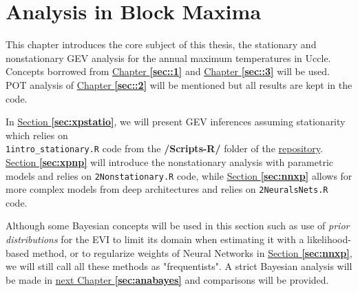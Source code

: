 \documentclass[11pt,a4paper,openany, twosided]{book}
\begin{document}
\newpage




\chapter{Analysis in Block Maxima}\label{sec:anagev}
\minitoc \thispagestyle{empty}
 \vspace{1cm}
 
 This chapter introduces the core subject of this thesis, the stationary and nonstationary GEV analysis for the annual maximum temperatures in Uccle. Concepts borrowed from \hyperref[sec::1]{Chapter \textbf{\ref{sec::1}}} and \hyperref[sec::3]{Chapter \textbf{\ref{sec::3}}} will be used. POT analysis of \hyperref[sec::2]{Chapter \textbf{\ref{sec::2}}} will be mentioned but all results are kept in the code. 

In \hyperref[sec:xpstatio]{Section \textbf{\ref{sec:xpstatio}}}, we will present GEV inferences assuming stationarity which relies on \\ \texttt{1intro\_stationary.R} code from the \textbf{/Scripts-R/} folder of the \href{https://github.com/proto4426/PissoortThesis/}{repository}.
\hyperref[sec:xpnp]{Section \textbf{\ref{sec:xpnp}}} will introduce the nonstationary analysis with parametric models and relies on \texttt{2Nonstationary.R} code, while \hyperref[sec:nnxp]{Section \textbf{\ref{sec:nnxp}}} allows for more complex models from deep architectures and relies on \texttt{2NeuralsNets.R} code. 

Although some Bayesian concepts will be used in this section such as use of \emph{prior distributions} for the EVI to limit its domain when estimating it with a likelihood-based method, or to regularize weights of Neural Networks in \hyperref[sec:nnxp]{Section \textbf{\ref{sec:nnxp}}}, we will still call all these methods as "frequentists".
A strict Bayesian analysis will be made in \hyperref[sec:anabayes]{next Chapter \textbf{\ref{sec:anabayes}}} and comparisons will be provided.

\newpage

\end{document}
